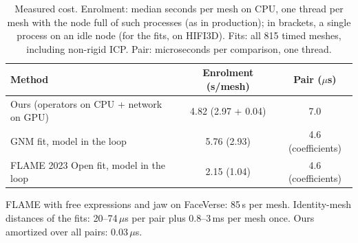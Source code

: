 \documentclass[10pt,twocolumn,letterpaper]{article}
\begin{document}
\begin{table}[!ht]
\centering
\scriptsize
\caption{Measured cost. Enrolment: median seconds per mesh on CPU, one thread per mesh with the node full of such processes (as in production); in brackets, a single process on an idle node (for the fits, on HIFI3D). Fits: all 815 timed meshes, including non-rigid ICP. Pair: microseconds per comparison, one thread.}
\label{tab:cost_measured}
\begin{tabular}{lcc}
\toprule
Method & Enrolment (s/mesh) & Pair ($\mu$s) \\
\midrule
Ours (operators on CPU + network on GPU) & 4.82 (2.97 + 0.04) & 7.0 \\
GNM fit, model in the loop & 5.76 (2.93) & 4.6 (coefficients) \\
FLAME 2023 Open fit, model in the loop & 2.15 (1.04) & 4.6 (coefficients) \\
\bottomrule
\end{tabular}

\vspace{0.3em}
\footnotesize{FLAME with free expressions and jaw on FaceVerse: 85\,s per mesh. Identity-mesh distances of the fits: 20--74\,$\mu$s per pair plus 0.8--3\,ms per mesh once. Ours amortized over all pairs: 0.03\,$\mu$s.}
\end{table}
\end{document}
